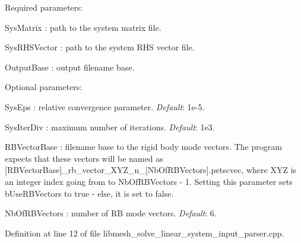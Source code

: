 Required parameters\+:
\begin{DoxyItemize}
\item {\ttfamily Sys\+Matrix} \+: path to the system matrix file.
\item {\ttfamily Sys\+R\+H\+S\+Vector} \+: path to the system R\+H\+S vector file.
\item {\ttfamily Output\+Base} \+: output filename base.
\end{DoxyItemize}

Optional parameters\+:
\begin{DoxyItemize}
\item {\ttfamily Sys\+Eps} \+: relative convergence parameter. {\itshape Default}\+: 1e-\/5.
\item {\ttfamily Sys\+Iter\+Div} \+: maximum number of iterations. {\itshape Default}\+: 1e3.
\item {\ttfamily R\+B\+Vector\+Base} \+: filename base to the rigid body mode vectors. The program expects that these vectors will be named as {\ttfamily \mbox{[}R\+B\+Vector\+Base\mbox{]}\+\_\+rb\+\_\+vector\+\_\+\+X\+Y\+Z\+\_\+n\+\_\+\mbox{[}Nb\+Of\+R\+B\+Vectors\mbox{]}.petscvec}, where {\ttfamily X\+Y\+Z} is an integer index going from {} to {\ttfamily Nb\+Of\+R\+B\+Vectors -\/ 1}. Setting this parameter sets {\ttfamily b\+Use\+R\+B\+Vectors} to {\ttfamily true} -\/ else, it is set to {\ttfamily false}.
\item {\ttfamily Nb\+Of\+R\+B\+Vectors} \+: number of R\+B mode vectors. {\itshape Default}\+: 6. 
\end{DoxyItemize}

Definition at line 12 of file libmesh\+\_\+solve\+\_\+linear\+\_\+system\+\_\+input\+\_\+parser.\+cpp.


